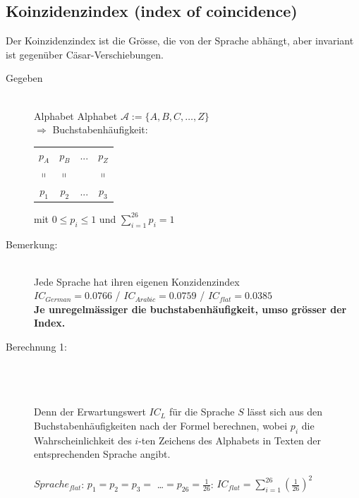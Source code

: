 \documentclass[10pt]{article}
\newcommand{\Pota}{\mathcal{A}}
\newcommand{\Ra}{\Rightarrow}
\begin{document}
\subsection{Koinzidenzindex (index of coincidence)}
Der Koinzidenzindex ist die Grösse, die von der Sprache abhängt, aber invariant ist gegenüber Cäsar-Verschiebungen.
\begin{description}
	\item[Gegeben] \hfill \\
		Alphabet Alphabet $\Pota:=\{A,B,C,\dots,Z\}$\\ 
		$\Ra$ Buchstabenhäufigkeit: 
		\begin{tabular}{c c c c}
			$p_A$ & $p_B$ & ... & $p_Z$ \\
			$\shortparallel$ & $\shortparallel$ & & $\shortparallel$ \\
			$p_1$ & $p_2$ & ... & $p_3$ \\
		\end{tabular} 
		mit $0\leq p_i \leq 1$ und $\sum_{i=1}^{26} p_i=1$
	\item[Bemerkung:] \hfill \\
		Jede Sprache hat ihren eigenen Konzidenzindex \\
		$IC_{German}=0.0766$ / $IC_{Arabic}=0.0759$ / $IC_{flat}=0.0385$ \\
		\textbf{Je unregelmässiger die buchstabenhäufigkeit, umso grösser der Index.}
		
	\item[Berechnung 1:] \hfill \\
		  \\ \\
		Denn der Erwartungswert $IC_L$ für die Sprache $S$ lässt sich aus den Buchstabenhäufigkeiten nach der Formel  berechnen, wobei $p_i$ die Wahrscheinlichkeit des $i$-ten Zeichens des Alphabets in Texten der entsprechenden Sprache angibt. \\
		\\
		$Sprache_{flat}$: $p_1=p_2=p_3=$ \dots $=p_{26}=\frac{1}{26}$: $IC_{flat}=\sum^{26}_{i=1}(\frac{1}{26})^2$ \\
		

\end{description}
\end{document}

